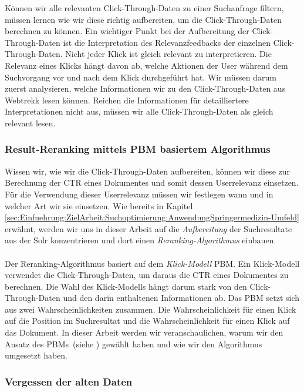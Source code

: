 Können wir alle relevanten Click-Through-Daten zu einer Suchanfrage filtern, müssen lernen wie wir diese richtig aufbereiten, um die Click-Through-Daten berechnen zu können.  Ein wichtiger Punkt bei der Aufbereitung der Click-Through-Daten ist die Interpretation des Relevanzfeedbacks der einzelnen Click-Through-Daten. Nicht jeder Klick ist gleich relevant zu interpretieren. Die Relevanz eines Klicks hängt davon ab, welche Aktionen der User während dem Suchvorgang vor und nach dem Klick durchgeführt hat. Wir müssen darum zuerst analysieren, welche Informationen wir zu den Click-Through-Daten aus Webtrekk lesen können.  Reichen die Informationen für detailliertere Interpretationen nicht aus, müssen wir alle Click-Through-Daten als gleich relevant lesen.

\subsubsection{Result-Reranking mittels PBM basiertem Algorithmus}
\label{sec:Einfuehrung:Methodik:Result-RerankingPBM}

Wissen wir, wie wir die Click-Through-Daten aufbereiten, können wir diese zur Berechnung der CTR eines Dokumentes und somit dessen Userrelevanz einsetzen. Für die Verwendung dieser Userrelevanz müssen wir festlegen wann und in welcher Art wir sie einsetzen. Wie bereits in Kapitel \ref{sec:Einfuehrung:ZielArbeit:Suchoptimierung:AnwendungSpringermedizin-Umfeld} erwähnt, werden wir uns in dieser Arbeit auf die \textit{Aufbereitung} der Suchresultate aus der Solr konzentrieren und dort einen \textit{Reranking-Algorithmus} einbauen. 
\\
\\
Der Reranking-Algorithmus basiert auf dem \textit{Klick-Modell} PBM. Ein Klick-Modell verwendet die Click-Through-Daten, um daraus die CTR eines Dokumentes zu berechnen. Die Wahl des Klick-Modells hängt darum stark von den Click-Through-Daten und den darin enthaltenen Informationen ab. Das PBM setzt sich aus zwei Wahrscheinlichkeiten zusammen. Die Wahrscheinlichkeit für einen Klick auf die Position im Suchresultat und die Wahrscheinlichkeit für einen Klick auf das Dokument. In dieser Arbeit werden wir veranschaulichen, warum wir den Ansatz des PBMs~(siehe \cite{pbm}) gewählt haben und wie wir den Algorithmus umgesetzt haben.

\subsubsection{Vergessen der alten Daten}
\label{sec:Einfuehrung:Vergessen}

